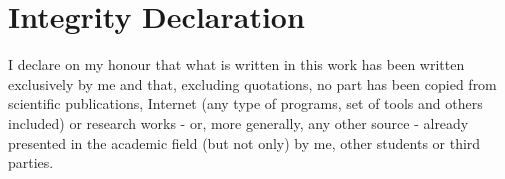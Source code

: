 \chapter*{Integrity Declaration}
I declare on my honour that what is written in this work has been written exclusively by me and that,
excluding quotations, no part has been copied from scientific publications, Internet (any type of programs,
set of tools and others included) or research works - or, more generally, any other source - already
presented in the academic field (but not only) by me, other students or third parties.